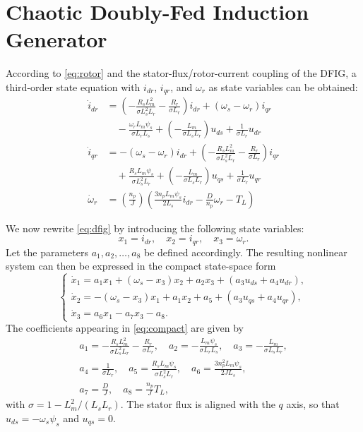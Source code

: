 \documentclass[conference]{IEEEtran}
\begin{document}
\section{Chaotic Doubly-Fed Induction Generator}
According to \eqref{eq:rotor} and the stator-flux/rotor-current coupling of the DFIG, a third-order state equation with $i_{dr}$, $i_{qr}$, and $\omega_r$ as state variables can be obtained:
\begin{equation}
\begin{aligned}
\dot{i}_{dr} &= \left(-\frac{R_sL_m^2}{\sigma L_s^2L_r} - \frac{R_r}{\sigma L_r}\right)i_{dr} + \left(\omega_s-\omega_r\right)i_{qr}\\
&\quad - \frac{\omega_rL_m\psi_s}{\sigma L_rL_s} + \left(-\frac{L_m}{\sigma L_sL_r}\right)u_{ds} + \frac{1}{\sigma L_r}u_{dr}\\
\dot{i}_{qr} &= -\left(\omega_s-\omega_r\right)i_{dr} + \left(-\frac{R_sL_m^2}{\sigma L_s^2L_r} - \frac{R_r}{\sigma L_r}\right)i_{qr}\\
&\quad + \frac{R_sL_m\psi_s}{\sigma L_s^2L_r} + \left(-\frac{L_m}{\sigma L_sL_r}\right)u_{qs} + \frac{1}{\sigma L_r}u_{qr}\\
\dot{\omega}_r &= \left(\frac{n_p}{J}\right)\left(\frac{3n_pL_m\psi_s}{2L_s}i_{dr} - \frac{D}{n_p}\omega_r - T_L\right)
\end{aligned}
\label{eq:dfig}
\end{equation}

We now rewrite \eqref{eq:dfig} by introducing the following state variables:
\[
x_1 = i_{dr},\quad x_2 = i_{qr},\quad x_3 = \omega_r .
\]
Let the parameters $a_1,a_2,\ldots,a_8$ be defined accordingly. The resulting nonlinear system can then be expressed in the compact state-space form
\begin{equation}
\begin{cases}
\dot{x}_1 = a_1x_1 + \left(\omega_s - x_3\right)x_2 + a_2x_3 + \left(a_3u_{ds} + a_4u_{dr}\right),\\
\dot{x}_2 = -\left(\omega_s - x_3\right)x_1 + a_1x_2 + a_5 + \left(a_3u_{qs} + a_4u_{qr}\right),\\
\dot{x}_3 = a_6x_1 - a_7x_3 - a_8.
\end{cases}
\label{eq:compact}
\end{equation}
The coefficients appearing in \eqref{eq:compact} are given by
\begin{gather*}
a_1 = -\frac{R_sL_m^2}{\sigma L_s^2L_r} - \frac{R_r}{\sigma L_r},\quad a_2 = -\frac{L_m\psi_s}{\sigma L_rL_s},\quad a_3 = -\frac{L_m}{\sigma L_sL_r},\\
a_4 = \frac{1}{\sigma L_r},\quad a_5 = \frac{R_sL_m\psi_s}{\sigma L_s^2L_r},\quad a_6 = \frac{3n_p^2L_m\psi_s}{2JL_s},\\
a_7 = \frac{D}{J},\quad a_8 = \frac{n_p}{J}T_L,
\end{gather*}
with $\sigma = 1 - L_m^2/(L_sL_r)$. The stator flux is aligned with the $q$ axis, so that $u_{ds} = -\omega_s\psi_s$ and $u_{qs} = 0$.
\end{document}
